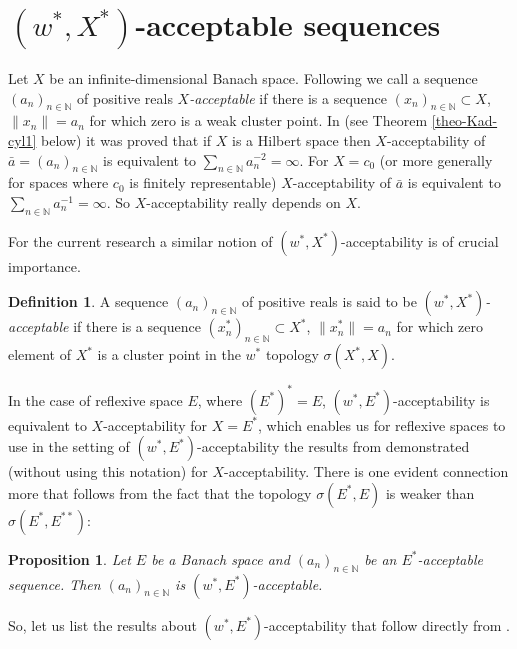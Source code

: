 \documentclass[11pt,twoside, reqno]{amsart}
\newcommand{\N}{{\mathbb N}}
\theoremstyle{plain}
\newtheorem{proposition}[theorem]{Proposition}
\theoremstyle{remark}
\theoremstyle{definition}
\newtheorem{definition}[theorem]{Definition}
\numberwithin{equation}{section}
\begin{document}
 

\section{$(w^*, X^*)$-acceptable sequences} \label{sec2}

Let $X$ be an infinite-dimensional Banach space. Following \cite{kaleor} we call a sequence $(a_n)_{n \in \N}$ of positive reals \emph{$X$-acceptable} if there is a sequence $(x_n)_{n \in \N} \subset X $, $\|x_n\|=a_n$ for which zero is a weak cluster point. In \cite{Kad-cyl} (see Theorem \ref{theo-Kad-cyl1} below) it was proved that if $X$ is a Hilbert space then $X$-acceptability of $\bar a = (a_n)_{n \in \N}$ is equivalent to $\sum_{n \in \N} a_n^{-2}=\infty$. For $X = c_0$
(or more generally for spaces where $c_0$ is finitely representable) $X$-acceptability of $\bar a$ is equivalent to $\sum_{n \in \N}
a_{n}^{-1}=\infty$. So $X$-acceptability really depends on $X$.

For the current research a similar notion of $(w^*, X^*)$-acceptability is of crucial importance.

\begin{definition} \label{def-w*accept}
A sequence $(a_n)_{n \in \N}$ of positive reals is said to be \emph{$(w^*, X^*)$-acceptable} if there is a sequence $(x_n^*)_{n \in \N} \subset X^* $, $\|x_n^*\|=a_n$ for which zero element of $X^*$ is a cluster point in the $w^*$ topology $\sigma(X^*, X)$.
\end{definition}

In the case of reflexive space $E$, where $(E^*)^* = E$, $(w^*, E^*)$-acceptability is equivalent to $X$-acceptability for $X = E^*$, which enables us for reflexive spaces to use in the setting of $(w^*, E^*)$-acceptability the results from \cite{Kad-cyl} demonstrated (without using this notation) for $X$-acceptability. There is one evident connection more that follows from the fact that the topology $\sigma(E^*, E)$ is weaker than $\sigma(E^*, E^{**})$:

\begin{proposition} \label{propX-vers_W*}
Let $E$ be a Banach space and $(a_n)_{n \in \N}$ be an $E^*$-acceptable sequence. Then $(a_n)_{n \in \N}$ is $(w^*, E^*)$-acceptable.
\end{proposition}

So, let us list the results about $(w^*, E^*)$-acceptability that follow directly from \cite{Kad-cyl}.
\end{document}
